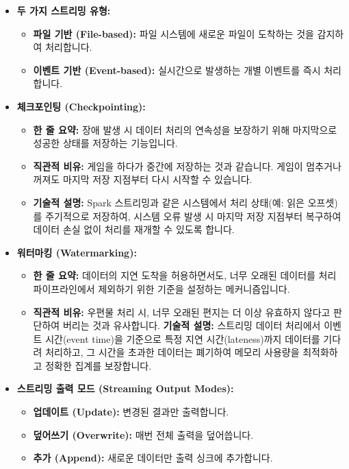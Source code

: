 \documentclass[11pt,a4paper]{article}
\theoremstyle{definition}
\begin{document}
\begin{itemize}
    \item \textbf{두 가지 스트리밍 유형:}
    \begin{itemize}
        \item \textbf{파일 기반 (File-based):} 파일 시스템에 새로운 파일이 도착하는 것을 감지하여 처리합니다.
        \item \textbf{이벤트 기반 (Event-based):} 실시간으로 발생하는 개별 이벤트를 즉시 처리합니다.
    \end{itemize}
    \item \textbf{체크포인팅 (Checkpointing):}
    \begin{itemize}
        \item \textbf{한 줄 요약:} 장애 발생 시 데이터 처리의 연속성을 보장하기 위해 마지막으로 성공한 상태를 저장하는 기능입니다.
        \item \textbf{직관적 비유:} 게임을 하다가 중간에 저장하는 것과 같습니다. 게임이 멈추거나 꺼져도 마지막 저장 지점부터 다시 시작할 수 있습니다.
        \item \textbf{기술적 설명:} Spark 스트리밍과 같은 시스템에서 처리 상태(예: 읽은 오프셋)를 주기적으로 저장하여, 시스템 오류 발생 시 마지막 저장 지점부터 복구하여 데이터 손실 없이 처리를 재개할 수 있도록 합니다.
    \end{itemize}
    \item \textbf{워터마킹 (Watermarking):}
    \begin{itemize}
        \item \textbf{한 줄 요약:} 데이터의 지연 도착을 허용하면서도, 너무 오래된 데이터를 처리 파이프라인에서 제외하기 위한 기준을 설정하는 메커니즘입니다.
        \item \textbf{직관적 비유:} 우편물 처리 시, 너무 오래된 편지는 더 이상 유효하지 않다고 판단하여 버리는 것과 유사합니다.
        \textbf{기술적 설명:} 스트리밍 데이터 처리에서 이벤트 시간(event time)을 기준으로 특정 지연 시간(lateness)까지 데이터를 기다려 처리하고, 그 시간을 초과한 데이터는 폐기하여 메모리 사용량을 최적화하고 정확한 집계를 보장합니다.
    \end{itemize}
    \item \textbf{스트리밍 출력 모드 (Streaming Output Modes):}
    \begin{itemize}
        \item \textbf{업데이트 (Update):} 변경된 결과만 출력합니다.
        \item \textbf{덮어쓰기 (Overwrite):} 매번 전체 출력을 덮어씁니다.
        \item \textbf{추가 (Append):} 새로운 데이터만 출력 싱크에 추가합니다.

\end{itemize}
\end{itemize}
\end{document}
